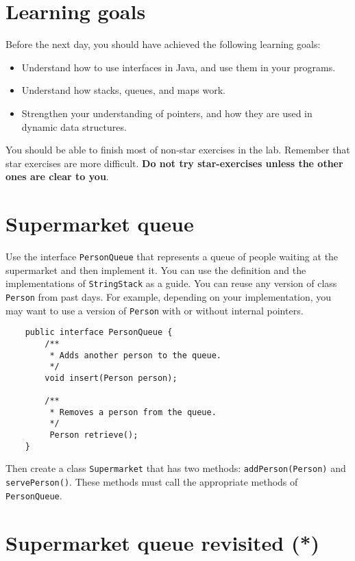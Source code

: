 \documentclass{article}
\begin{document}
\section*{Learning goals}
\label{sec:learning-goals}

Before the next day, you should have achieved the following learning
goals: 

\begin{itemize}
\item Understand how to use interfaces in Java, and use them in your
  programs. 
\item Understand how stacks, queues, and maps work. 
\item Strengthen your understanding of pointers, and how they are used
  in dynamic data structures. 
\end{itemize}

You should be able to finish most of non-star exercises in the lab. 
Remember that star exercises are more difficult. 
\textbf{Do not try star-exercises unless the other ones are clear to
  you}.  

\section{Supermarket queue}
\label{sec:queues}

Use the interface \verb+PersonQueue+ that represents a queue of
people waiting at the supermarket and then implement it. You can use
the definition and the implementations of \verb+StringStack+ as a
guide. You can reuse any version of class \verb+Person+ from past
days. For example, depending on your implementation, you may want to
use a version of \verb+Person+ with or without internal pointers. 

\begin{verbatim}
    public interface PersonQueue {
        /**
         * Adds another person to the queue.
         */
        void insert(Person person);

        /**
         * Removes a person from the queue.
         */ 
         Person retrieve();
    }
\end{verbatim}

Then create a class \verb+Supermarket+ that has two methods:
\verb+addPerson(Person)+ and \verb+servePerson()+. These methods must
call the appropriate methods of \verb+PersonQueue+. 

\section{Supermarket queue revisited (*)}
\label{sec:superm-queue-revis}
\end{document}
